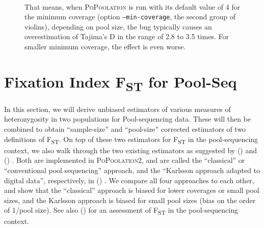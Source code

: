 \documentclass[a4paper,fontsize=9pt,DIV=14]{scrartcl}
\newcounter{todo}
\newcommand\todo[1]{{\stepcounter{todo}\color{purple}{TODO \arabic{todo}: #1}}}
\newcommand\citeay[1]{\citeauthor{#1} (\citeyear{#1}) \cite{#1}}
\newcommand\toolname{\textsc}
\newcommand{\fst}{F\textsubscript{ST}}
\begin{document}
\begin{figure}[p]
{        \\
        That means, when \toolname{PoPoolation} is run with its default value of 4 for the minimum coverage (option \texttt{--min-coverage}, the second group of violins), depending on pool size, the bug typically causes an overestimation of Tajima's D in the range of 2.8 to 3.5 times. For smaller minimum coverage, the effect is even worse.
    }
\label{fig:bug-exam}
\end{figure}





\section{Fixation Index \texorpdfstring{\fst}{FST} for Pool-Seq}
\label{supp:sec:FST}

In this section, we will derive unbiased estimators of various measures of heterozygosity in two populations for Pool-sequencing data.
These will then be combined to obtain ``sample-size'' and ``pool-size'' corrected estimators of two definitions of \fst.
On top of these two estimators for \fst{} in the pool-sequencing context, we also walk through the two existing estimators as suggested by \citeay{Kofler2011b} and \citeay{Karlsson2007}.
Both are implemented in \toolname{PoPoolation2}, and are called the ``classical'' or ``conventional pool sequencing'' approach, and the ``Karlsson approach adapted to digital data'', respectively, in \citeay{Kofler2011b}.
We compare all four approaches to each other, and show that the ``classical'' approach is biased for lower coverages or small pool sizes, and the Karlsson approach is biased for small pool sizes (bias on the order of 1/pool size).
See also \citeay{Hivert2018} for an assessment of \fst{} in the pool-sequencing context.
\end{document}
